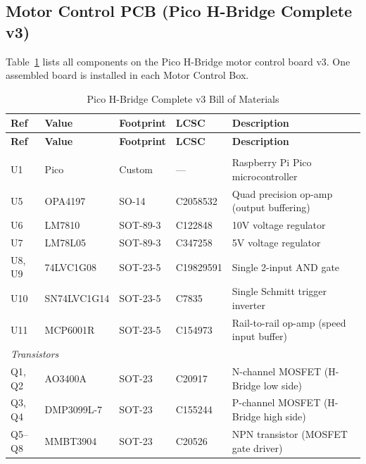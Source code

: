 \documentclass[main.tex]{subfiles}
\begin{document}
\subsection{Motor Control PCB (Pico H-Bridge Complete v3)}
\label{sec:bom-pico}

Table~\ref{tab:bom} lists all components on the Pico H-Bridge motor control board v3. One assembled board is installed in each Motor Control Box.

\renewcommand{\arraystretch}{1.3}
\begin{longtable}{l l l l p{4.2cm}}
\caption{Pico H-Bridge Complete v3 Bill of Materials} \label{tab:bom} \\
\hline
\textbf{Ref} & \textbf{Value} & \textbf{Footprint} & \textbf{LCSC} & \textbf{Description} \\
\hline
\endfirsthead
\hline
\textbf{Ref} & \textbf{Value} & \textbf{Footprint} & \textbf{LCSC} & \textbf{Description} \\
\hline
\endhead
\hline
\endfoot

\multicolumn{5}{l}{\textit{Integrated Circuits}} \\
\hline
U1 & Pico & Custom & --- & Raspberry Pi Pico microcontroller \\
U5 & OPA4197 & SO-14 & C2058532 & Quad precision op-amp (output buffering) \\
U6 & LM7810 & SOT-89-3 & C122848 & 10V voltage regulator \\
U7 & LM78L05 & SOT-89-3 & C347258 & 5V voltage regulator \\
U8, U9 & 74LVC1G08 & SOT-23-5 & C19829591 & Single 2-input AND gate \\
U10 & SN74LVC1G14 & SOT-23-5 & C7835 & Single Schmitt trigger inverter \\
U11 & MCP6001R & SOT-23-5 & C154973 & Rail-to-rail op-amp (speed input buffer) \\
\hline

\multicolumn{5}{l}{\textit{Transistors}} \\
\hline
Q1, Q2 & AO3400A & SOT-23 & C20917 & N-channel MOSFET (H-Bridge low side) \\
Q3, Q4 & DMP3099L-7 & SOT-23 & C155244 & P-channel MOSFET (H-Bridge high side) \\
Q5--Q8 & MMBT3904 & SOT-23 & C20526 & NPN transistor (MOSFET gate driver) \\
\hline


\end{longtable}
\end{document}
